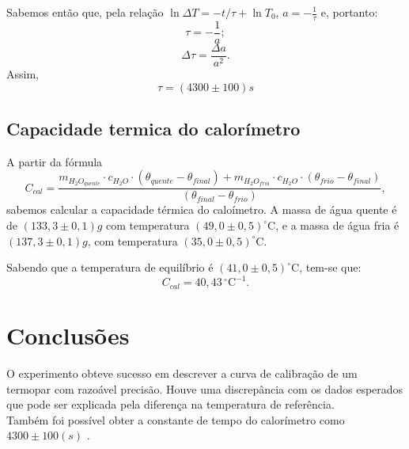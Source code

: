 \documentclass[12pt,a4paper]{article}
\begin{document}
Sabemos então que, pela relação $ \ln \Delta T = -t/\tau + \ln T_0 $, $a = -\frac{1}{\tau}$ e, portanto:
$$ \tau = -\frac{1}{a}; $$
$$ \Delta\tau =\frac{\Delta a}{a^2}. $$
Assim, 
$$ \tau = (4300 \pm 100)s $$
\subsection{Capacidade termica do calorímetro}

A partir da fórmula $$C_{cal} = \frac{m_{H_2O_{quente}}\cdot c_{H_2O}\cdot(\theta_{quente} - \theta_{final}) + m_{H_2O_{fria}}\cdot c_{H_2O}\cdot(\theta_{frio} - \theta_{final})}{(\theta_{final}-\theta_{frio})},$$
sabemos calcular a capacidade térmica do caloímetro.
A massa de água quente é de $(133,3 \pm 0,1)g$ com temperatura $(49,0 \pm 0,5)^{\circ}\mathrm{C}$, e a massa de água fria é $(137,3 \pm 0,1)g$, com temperatura $(35,0 \pm 0,5)^{\circ}\mathrm{C}$.

Sabendo que a temperatura de equilíbrio é $(41,0 \pm 0,5)^{\circ}\mathrm{C}$, tem-se que:
$$C_{cal} = 40,43 \,^{\circ}\mathrm{C}^{-1}. $$

\section{Conclusões}
O experimento obteve sucesso em descrever a curva de calibração de um termopar com razoável precisão. Houve uma discrepância com os dados esperados que pode ser explicada pela diferença na temperatura de referência.\\
Também foi possível obter a constante de tempo do calorímetro como $4300 \pm 100 (s)$ .
\end{document}
